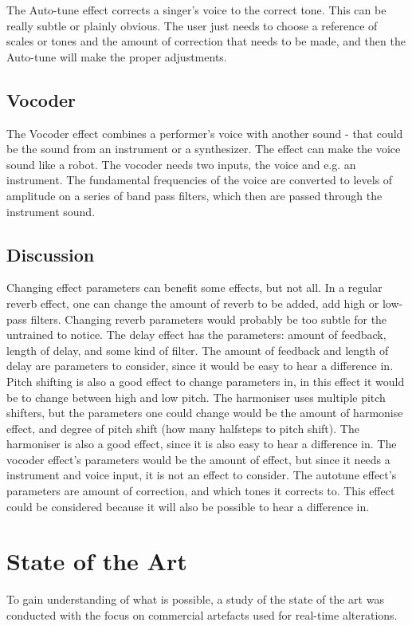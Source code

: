 The Auto-tune effect corrects a singer's voice to the correct tone\citep{Hadhazy_2010}. This can be really subtle or plainly obvious. 
The user just needs to choose a reference of scales or tones and the amount of correction that needs to be made, and then the Auto-tune will make the proper adjustments.

\subsection{Vocoder}

The Vocoder effect combines a performer's voice with another sound - that could be the sound from an instrument or a synthesizer\citep{Vocoder_00}. 
The effect can make the voice sound like a robot. The vocoder needs two inputs, the voice and e.g. an instrument. The fundamental frequencies of the voice are converted to levels of amplitude on a series of band pass filters, which then are passed through the instrument sound.

\subsection{Discussion}

Changing effect parameters can benefit some effects, but not all. In a regular reverb effect, one can change the amount of reverb to be added, add high or low-pass filters. Changing reverb parameters would probably be too subtle for the untrained to notice.
The delay effect has the parameters: amount of feedback, length of delay, and some kind of filter. The amount of feedback and length of delay are parameters to consider, since it would be easy to hear a difference in. 
Pitch shifting is also a good effect to change parameters in, in this effect it would be to change between high and low pitch. The harmoniser uses multiple pitch shifters, but the parameters one could change would be the amount of harmonise effect, and degree of pitch shift (how many halfsteps to pitch shift). The harmoniser is also a good effect, since it is also easy to hear a difference in.    
The vocoder effect's parameters would be the amount of effect, but since it needs a instrument and voice input, it is not an effect to consider. 
The autotune effect's parameters are amount of correction, and which tones it corrects to. This effect could be considered because it will also be possible to hear a difference in. 


\section{State of the Art}
To gain understanding of what is possible, a study of the state of the art was conducted with the focus on commercial artefacts used for real-time alterations.

